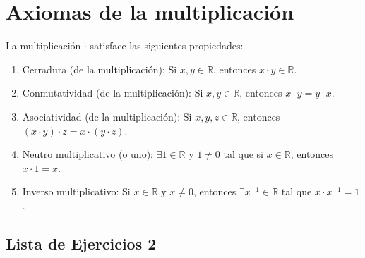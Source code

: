 \documentclass[11pt]{article}
\newcommand{\R}{\mathbb{R}}
\begin{document}
\section*{Axiomas de la multiplicación}
La multiplicación $\cdot$ satisface las siguientes propiedades:

\begin{enumerate}[start=6]%
 \item Cerradura (de la multiplicación): Si $x,y\in \R$, entonces $x\cdot y\in \R$.

 \item Conmutatividad (de la multiplicación): Si $x,y\in \R$, entonces $x\cdot y = y\cdot x$.

 \item Asociatividad (de la multiplicación): Si $x,y,z\in \R$, entonces $(x\cdot y) \cdot z = x \cdot (y\cdot z)$.

 \item Neutro multiplicativo (o uno): $\exists 1\in \R$ y $1\neq 0$ tal que si $x\in \R$, entonces $x\cdot 1 = x$.

 \item Inverso multiplicativo: Si $x\in \R$ y $x\neq 0$, entonces $\exists x^{-1}\in \R$ tal que $x\cdot x^{-1}=1$.
\end{enumerate}

\subsection*{Lista de Ejercicios 2}
\end{document}

